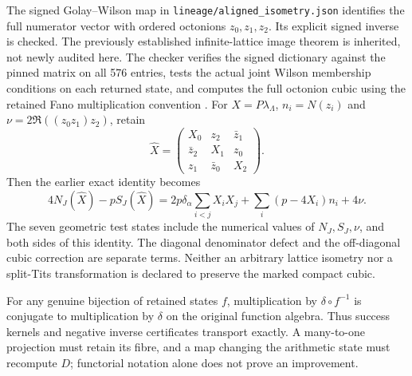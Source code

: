 \documentclass[11pt]{article}
\theoremstyle{definition}\newtheorem{definition}[theorem]{Definition}
\theoremstyle{remark}\newtheorem{remark}[theorem]{Remark}
\begin{document}
The signed Golay--Wilson map in \texttt{lineage/aligned\_isometry.json}
identifies the full numerator vector with ordered octonions $z_0,z_1,z_2$.
Its explicit signed inverse is checked. The previously established
infinite-lattice image theorem is inherited, not newly audited here. The
checker verifies the signed dictionary against the pinned matrix on all
576 entries, tests the actual joint Wilson membership conditions on each
returned state, and computes the full octonion cubic using the retained
Fano multiplication convention \cite{wilson}.
For $X=P\lambda_\Lambda$, $n_i=N(z_i)$ and
$\nu=2\Re((z_0z_1)z_2)$, retain
\[
 \widehat X=\begin{pmatrix}X_0&z_2&\bar z_1\\\bar z_2&X_1&z_0\\
 z_1&\bar z_0&X_2\end{pmatrix}.
\]
Then the earlier exact identity becomes
\[
 4N_J(\widehat X)-pS_J(\widehat X)
 =2p\delta_\alpha\sum_{i<j}X_iX_j+\sum_i(p-4X_i)n_i+4\nu.
\]
The seven geometric test states include the numerical values of
$N_J,S_J,\nu$, and both sides of this identity. The diagonal denominator
defect and the off-diagonal cubic correction are separate terms. Neither an arbitrary lattice isometry nor a split-Tits
transformation is declared to preserve the marked compact cubic.

For any genuine bijection of retained states $f$, multiplication by
$\delta\circ f^{-1}$ is conjugate to multiplication by $\delta$ on the original
function algebra. Thus success kernels and negative inverse certificates
transport exactly. A many-to-one projection must retain its fibre, and a
map changing the arithmetic state must recompute $D$; functorial notation
alone does not prove an improvement.
\end{document}
